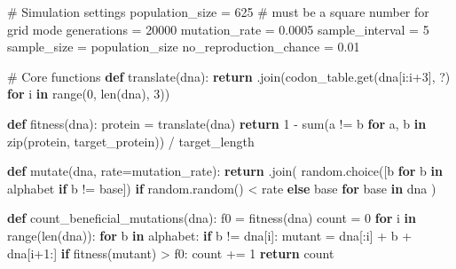 \documentclass[
  letterpaper,
  DIV=11,
  numbers=noendperiod]{scrreprt}
\newenvironment{Shaded}{\begin{snugshade}}{\end{snugshade}}
\newcommand{\BuiltInTok}[1]{\textcolor[rgb]{0.00,0.23,0.31}{#1}}
\newcommand{\CommentTok}[1]{\textcolor[rgb]{0.37,0.37,0.37}{#1}}
\newcommand{\ControlFlowTok}[1]{\textcolor[rgb]{0.00,0.23,0.31}{\textbf{#1}}}
\newcommand{\DecValTok}[1]{\textcolor[rgb]{0.68,0.00,0.00}{#1}}
\newcommand{\FloatTok}[1]{\textcolor[rgb]{0.68,0.00,0.00}{#1}}
\newcommand{\KeywordTok}[1]{\textcolor[rgb]{0.00,0.23,0.31}{\textbf{#1}}}
\newcommand{\NormalTok}[1]{\textcolor[rgb]{0.00,0.23,0.31}{#1}}
\newcommand{\OperatorTok}[1]{\textcolor[rgb]{0.37,0.37,0.37}{#1}}
\newcommand{\StringTok}[1]{\textcolor[rgb]{0.13,0.47,0.30}{#1}}
\theoremstyle{definition}
\theoremstyle{remark}
\begin{document}
\begin{tcolorbox}
\begin{Shaded}
\begin{Highlighting}[]
\CommentTok{\# Simulation settings}
\NormalTok{population\_size }\OperatorTok{=} \DecValTok{625}  \CommentTok{\# must be a square number for grid mode}
\NormalTok{generations }\OperatorTok{=} \DecValTok{20000}
\NormalTok{mutation\_rate }\OperatorTok{=} \FloatTok{0.0005}   
\NormalTok{sample\_interval }\OperatorTok{=} \DecValTok{5}
\NormalTok{sample\_size }\OperatorTok{=}\NormalTok{ population\_size}
\NormalTok{no\_reproduction\_chance }\OperatorTok{=} \FloatTok{0.01}

\CommentTok{\# Core functions}
\KeywordTok{def}\NormalTok{ translate(dna):}
    \ControlFlowTok{return} \StringTok{\textquotesingle{}\textquotesingle{}}\NormalTok{.join(codon\_table.get(dna[i:i}\OperatorTok{+}\DecValTok{3}\NormalTok{], }\StringTok{\textquotesingle{}?\textquotesingle{}}\NormalTok{) }\ControlFlowTok{for}\NormalTok{ i }\KeywordTok{in} \BuiltInTok{range}\NormalTok{(}\DecValTok{0}\NormalTok{, }\BuiltInTok{len}\NormalTok{(dna), }\DecValTok{3}\NormalTok{))}

\KeywordTok{def}\NormalTok{ fitness(dna):}
\NormalTok{    protein }\OperatorTok{=}\NormalTok{ translate(dna)}
    \ControlFlowTok{return} \DecValTok{1} \OperatorTok{{-}} \BuiltInTok{sum}\NormalTok{(a }\OperatorTok{!=}\NormalTok{ b }\ControlFlowTok{for}\NormalTok{ a, b }\KeywordTok{in} \BuiltInTok{zip}\NormalTok{(protein, target\_protein)) }\OperatorTok{/}\NormalTok{ target\_length}

\KeywordTok{def}\NormalTok{ mutate(dna, rate}\OperatorTok{=}\NormalTok{mutation\_rate):}
    \ControlFlowTok{return} \StringTok{\textquotesingle{}\textquotesingle{}}\NormalTok{.join(}
\NormalTok{        random.choice([b }\ControlFlowTok{for}\NormalTok{ b }\KeywordTok{in}\NormalTok{ alphabet }\ControlFlowTok{if}\NormalTok{ b }\OperatorTok{!=}\NormalTok{ base]) }\ControlFlowTok{if}\NormalTok{ random.random() }\OperatorTok{\textless{}}\NormalTok{ rate }\ControlFlowTok{else}\NormalTok{ base}
        \ControlFlowTok{for}\NormalTok{ base }\KeywordTok{in}\NormalTok{ dna}
\NormalTok{    )}

\KeywordTok{def}\NormalTok{ count\_beneficial\_mutations(dna):}
\NormalTok{    f0 }\OperatorTok{=}\NormalTok{ fitness(dna)}
\NormalTok{    count }\OperatorTok{=} \DecValTok{0}
    \ControlFlowTok{for}\NormalTok{ i }\KeywordTok{in} \BuiltInTok{range}\NormalTok{(}\BuiltInTok{len}\NormalTok{(dna)):}
        \ControlFlowTok{for}\NormalTok{ b }\KeywordTok{in}\NormalTok{ alphabet:}
            \ControlFlowTok{if}\NormalTok{ b }\OperatorTok{!=}\NormalTok{ dna[i]:}
\NormalTok{                mutant }\OperatorTok{=}\NormalTok{ dna[:i] }\OperatorTok{+}\NormalTok{ b }\OperatorTok{+}\NormalTok{ dna[i}\OperatorTok{+}\DecValTok{1}\NormalTok{:]}
                \ControlFlowTok{if}\NormalTok{ fitness(mutant) }\OperatorTok{\textgreater{}}\NormalTok{ f0:}
\NormalTok{                    count }\OperatorTok{+=} \DecValTok{1}
    \ControlFlowTok{return}\NormalTok{ count}


\end{Highlighting}
\end{Shaded}
\end{tcolorbox}
\end{document}
